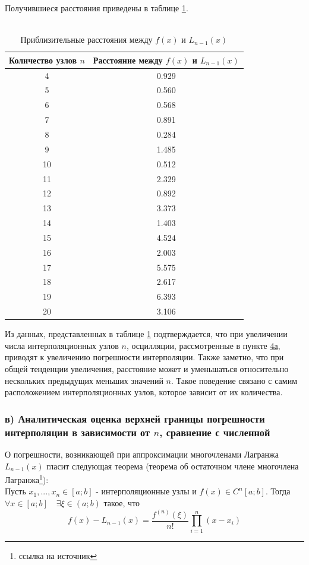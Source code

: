 Получившиеся расстояния приведены в таблице \ref{tab:table2}.

\begin{table}[h!]
\caption{\\ Приблизительные расстояния между \( f(x) \) и \( L_{n-1}(x) \)}
\centering
\begin{tabular}{|c|c|}
\hline
Количество узлов $n$ & Расстояние между $f(x)$ и $L_{n-1}(x)$ \\ \hline
4 & 0.929 \\ \hline
5 & 0.560 \\ \hline
6 & 0.568 \\ \hline
7 & 0.891 \\ \hline
8 & 0.284 \\ \hline
9 & 1.485 \\ \hline
10 & 0.512 \\ \hline
11 & 2.329 \\ \hline
12 & 0.892 \\ \hline
13 & 3.373 \\ \hline
14 & 1.403 \\ \hline
15 & 4.524 \\ \hline
16 & 2.003 \\ \hline
17 & 5.575 \\ \hline
18 & 2.617 \\ \hline
19 & 6.393 \\ \hline
20 & 3.106 \\ \hline
\end{tabular}
\label{tab:table2}
\end{table}

Из данных, представленных в таблице \ref{tab:table2} подтверждается, что при увеличении числа интерполяционных узлов $n$, осцилляции, рассмотренные в пункте \hyperref[z4a]{4а}, приводят к увеличению погрешности интерполяции. Также заметно, что при общей тенденции увеличения, расстояние может и уменьшаться относительно нескольких предыдущих меньших значений $n$. Такое поведение связано с самим расположением интерполяционных узлов, которое зависит от их количества.
\pagebreak

\subsubsection{в) Аналитическая оценка верхней границы погрешности интерполяции в зависимости от $n$, сравнение с численной}

О погрешности, возникающей при аппроксимации многочленами Лагранжа $L_{n-1}(x)$ гласит следующая теорема (теорема об остаточном члене многочлена Лагранжа\footnote{ссылка на источник}):
\vspace{5mm}\\
Пусть $x_1, ..., x_n \in [a;b]$ - интерполяционные узлы и $f(x) \in C^n[a;b]$. Тогда $\forall x \in [a;b] \quad \exists \xi \in (a;b)$ такое, что
\begin{equation}
\label{eq:8}
    f(x) - L_{n-1}(x) = \frac{f^{(n)}(\xi)}{n!} \prod_{i = 1}^{n}(x-x_i)
\end{equation}
\vspace{5mm}

